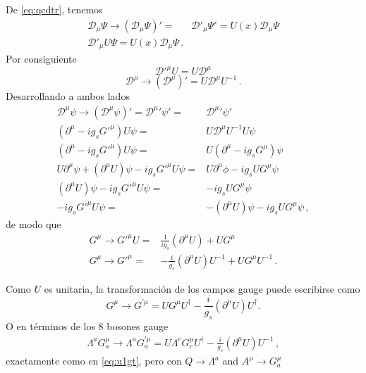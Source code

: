 De \eqref{eq:qcdtr}, tenemos
\begin{align}
   \mathcal{D}_\mu\Psi\to \left(\mathcal{D}_\mu\Psi\right)'=&\mathcal{D}'_\mu\Psi'
  =U(x)\mathcal{D}_\mu\Psi\nonumber\\
\mathcal{D}'_\mu U\Psi
  =U(x)\mathcal{D}_\mu\Psi\,.
\end{align}
Por consiguiente
\begin{equation}
  {\mathcal{D}'}^\mu U=U\mathcal{D}^\mu
\end{equation}
\begin{equation}
  \label{eq:udu}
  \mathcal{D}^\mu\to\left(
    \mathcal{D}^\mu
  \right)'=U\mathcal{D}^\mu U^{-1}\,.
\end{equation}
Desarrollando a ambos lados
\begin{align}
  \label{eq:251qft}
   {\mathcal{D}}^\mu\psi\to{\left({\mathcal{D}}^\mu\psi\right)}'=
  {\mathcal{D}^\mu}'\psi'=&{\mathcal{D}^\mu}'\psi'\nonumber\\
  (\partial^\mu-i g_s {G'}^\mu) U\psi=&U\mathcal{D}^\mu U^{-1}U\psi\nonumber\\
  (\partial^\mu-i g_s {G'}^\mu) U\psi=&U(\partial^\mu-i g_s {G}^\mu)\psi\nonumber\\
  U\partial^\mu\psi+(\partial^\mu U)\psi-i g_s {G'}^\mu U \psi=&U\partial^\mu\phi-i g_s U {G}^\mu \psi\nonumber\\
  (\partial^\mu U)\psi-i g_s {G'}^\mu U \psi=&-i g_s U {G}^\mu \psi\nonumber\\
  -i g_s {G'}^\mu U \psi=&-(\partial^\mu U)\psi-i g_s U {G}^\mu \psi\,,
\end{align}
de modo que
\begin{align}
 G^{\mu}\to     {G'}^\mu U =&\frac{1}{i g_s}(\partial^\mu U)+ U{G}^\mu \nonumber\\
 G^{\mu}\to  {G'}^\mu  =&-\frac{i}{g_s}(\partial^\mu U)U^{-1}+ U{G}^\mu U^{-1}\,.
\end{align}

Como $U$ es unitaria, la transformación de los campos gauge puede escribirse como
\begin{equation}
    {G}^\mu\to{G}^{\prime \mu}=U{G}^\mu U^{\dagger}-\frac{i}{g_s}\left(\partial^\mu U\right)U^\dagger.
\end{equation}
O en términos de los 8 bosones gauge
\begin{align}
  \Lambda^a{G}^\mu_a\to\Lambda^a{G}^{\prime \mu}_a=U\Lambda^c{G}^\mu_c U^{\dagger}-\frac{i}{g_s}(\partial^\mu U)U^{-1}\,,
\end{align}
exactamente como en \eqref{eq:u1gt}, pero con $Q\to \Lambda^a$ and $A^\mu\to G^\mu_a$

